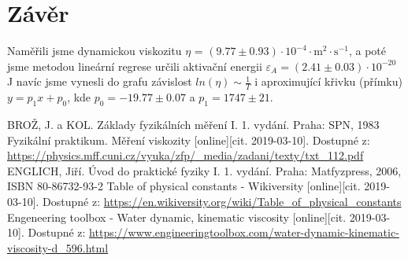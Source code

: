 \documentclass{article}
\begin{document}
\section*{Závěr}
Naměřili jsme dynamickou viskozitu $\eta$ = $(9.77\pm0.93)\cdot 10^{-4} \cdot \mathrm{m^{2} \cdot s^{-1}}$,  a poté jsme metodou lineární regrese určili aktivační energii $\varepsilon_{A} = (2.41\pm0.03)\cdot\mathrm{10^{-20}}$ J navíc jsme vynesli do grafu závislost $ln(\eta) \sim \frac{1}{T}$ i aproximující křivku (přímku) $y = p_{1}x + p_{0}$, kde $p_{0} = -19.77\pm0.07$ a $p_{1} = 1747\pm21.$

\renewcommand\refname{Použitá literatura}
\begin{thebibliography}{}
BROŽ, J. a KOL. Základy fyzikálních měření I. 1. vydání. Praha: SPN, 1983
Fyzikální praktikum. Měření viskozity [online][cit. 2019-03-10]. Dostupné z:  
\url{https://physics.mff.cuni.cz/vyuka/zfp/_media/zadani/texty/txt_112.pdf}
ENGLICH, Jiří. Úvod do praktické fyziky I. 1. vydání. Praha: Matfyzpress, 2006, ISBN 80-86732-93-2
Table of physical constants - Wikiversity [online][cit. 2019-03-10]. Dostupné z:  
\url{https://en.wikiversity.org/wiki/Table_of_physical_constants}
Engeneering toolbox - Water dynamic, kinematic viscosity [online][cit. 2019-03-10]. Dostupné z:  
\url{https://www.engineeringtoolbox.com/water-dynamic-kinematic-viscosity-d_596.html}
\end{thebibliography}
\end{document}
